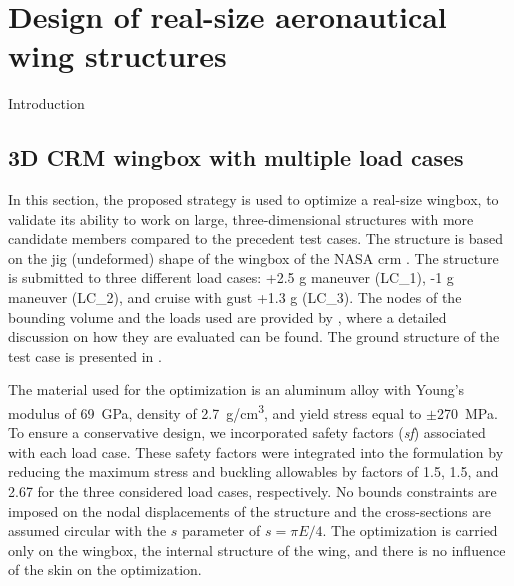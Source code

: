\setchapterpreamble[u]{\margintoc}
\glsresetall %

\chapter{Design of real-size aeronautical wing structures}
Introduction
\section{3D CRM wingbox with multiple load cases}

In this section, the proposed strategy is used to optimize a real-size wingbox, to validate its ability to work on large, three-dimensional structures with more candidate members compared to the precedent test cases. The structure is based on the jig (undeformed) shape of the wingbox of the NASA \gls{crm} \citep{brooks_benchmark_2018}. The structure is submitted to three different load cases: +2.5 g maneuver (LC\_1), -1 g maneuver (LC\_2), and cruise with gust +1.3 g (LC\_3). The nodes of the bounding volume and the loads used are provided by \cite{fakhimi_discrete_2021}, where a detailed discussion on how they are evaluated can be found. The ground structure of the test case is presented in .

The material used for the optimization is an aluminum alloy with Young's modulus of \qty{69}{\GPa}, density of \qty{2.7}{\gram/\cm^3}, and yield stress equal to $\pm$\qty{270}{\MPa}. To ensure a conservative design, we incorporated safety factors (\textit{sf}) associated with each load case. These safety factors were integrated into the formulation by reducing the maximum stress and buckling allowables by factors of 1.5, 1.5, and 2.67 for the three considered load cases, respectively. No bounds constraints are imposed on the nodal displacements of the structure and the cross-sections are assumed circular with the $s$ parameter of  $s = \pi E/4$. The optimization is carried only on the wingbox, the internal structure of the wing, and there is no influence of the skin on the optimization.

